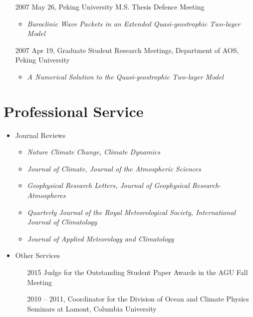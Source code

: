 \documentclass[11pt]{article}
\newcommand{\meetingName}[1]{#1}
\newcommand{\ptitle}[1]{\textit{#1}}
\begin{document}
\begin{itemize}[leftmargin=10ex, itemsep=1ex]
	\item [2007]May 26,  \meetingName{Peking University M.S. Thesis Defence Meeting}
	\begin{itemize}[leftmargin=4ex]
		\item \ptitle{Baroclinic Wave Packets in an Extended Quasi-geostrophic Two-layer Model}
		\end{itemize}
	
	\item [2007]Apr 19, \meetingName{Graduate Student Research Meetings, Department of AOS, Peking University}
	\begin{itemize}[leftmargin=4ex]
		\item \ptitle{A Numerical Solution to the Quasi-geostrophic Two-layer Model}
		\end{itemize}

\end{itemize}


\section{Professional Service} 
\begin{itemize}[leftmargin=4ex, itemsep=1ex]
	\item Journal Reviews
    	\begin{itemize}[leftmargin=4ex]
	\item \textit{Nature Climate Change, Climate Dynamics}
    	\item \textit{Journal of Climate, Journal of the Atmospheric Sciences}
	\item \textit{Geophysical Research Letters, Journal of Geophysical Research-Atmospheres}
	\item \textit{Quarterly Journal of the Royal Meteorological Society, International Journal of Climatology}
	\item \textit{Journal of Applied Meteorology and Climatology}	
    	\end{itemize}
	
	\item Other Services
	\begin{itemize}[leftmargin=10ex]
		\item[2015] Judge for the Outstanding Student Paper Awards in the AGU Fall Meeting
		\item[2010]-- 2011, Coordinator for the Division of Ocean and Climate Physics Seminars at Lamont, Columbia University
	\end{itemize}
\end{itemize}
	
\end{document}
